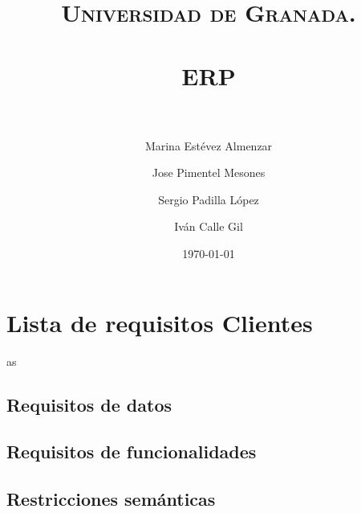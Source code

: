 \documentclass[paper=a4, fontsize=11pt, spanish]{scrartcl}
\title{
  \normalfont \normalsize 
  \textsc{Universidad de Granada.} \\ [25pt] 
  \horrule{0.5pt} \\[0.4cm] 
  \huge ERP \\
  \horrule{2pt} \\[0.5cm] 
}
\author{Marina Estévez Almenzar\\
\and 
Jose Pimentel Mesones\\
\and	
Sergio Padilla López\\
\and
Iván Calle Gil\\}
\date{\normalsize\today}
\begin{document}
\maketitle
\section{Lista de requisitos Clientes}
as
\subsection{Requisitos de datos}
\subsection{Requisitos de funcionalidades}
\subsection{Restricciones semánticas}
\end{document}
